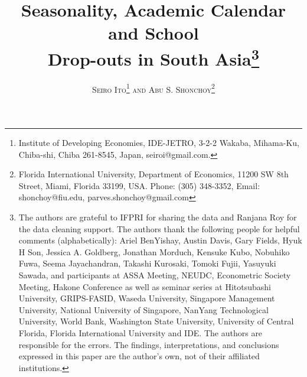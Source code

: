\documentclass[12pt,letterpaper]{article}
\newcommand{\0}{\ensuremath{\mbox{\boldmath $0$}}}
\begin{document}
\singlespacing

\title{
\vspace{-1.25cm}
Seasonality, Academic Calendar and School \\
Drop-outs in South Asia\thanks{\protect%
The authors are grateful to IFPRI for sharing the data and Ranjana Roy for the data cleaning support. The authors thank the following people for helpful comments (alphabetically): Ariel BenYishay, Austin Davis, Gary Fields, Hyuk H Son, Jessica A. Goldberg, Jonathan Morduch, Kensuke Kubo, Nobuhiko Fuwa, Seema Jayachandran, Takashi Kurosaki, Tomoki Fujii, Yasuyuki Sawada, and participants at ASSA Meeting, NEUDC, Econometric Society Meeting, Hakone Conference as well as seminar series at Hitotsubashi University, GRIPS-FASID, Waseda University, Singapore Management University, National University of Singapore, NanYang Technological University, World Bank, Washington State University, University of Central Florida, Florida International University and IDE. The authors are responsible for the errors. The findings, interpretations, and conclusions expressed in this paper are the author's own, not of their affiliated institutions. \vspace{0.25em}}} 

\author
{\textsc{Seiro Ito}\thanks{
Institute of Developing Economies, IDE-JETRO, 3-2-2 Wakaba, Mihama-Ku, Chiba-shi, Chiba 261-8545, Japan, seiroi@gmail.com.}
{\textsc{ and Abu S. Shonchoy}}\thanks{
Florida International University, Department of Economics, 11200 SW 8th Street, Miami, Florida 33199, USA. Phone: (305) 348-3352,
Email: shonchoy@fiu.edu, parves.shonchoy@gmail.com}}

\end{document}
